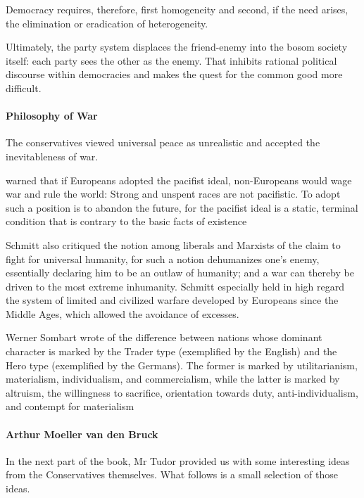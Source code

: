 \begin{quotex}
Democracy requires, therefore, first homogeneity and second, if the need arises, the elimination or eradication of
heterogeneity. 

\end{quotex}
Ultimately, the party system displaces the friend-enemy into the bosom society itself: each party sees the other as the
enemy. That inhibits rational political discourse within democracies and makes the quest for the common good more
difficult.

\paragraph{Philosophy of War}
The conservatives viewed universal peace as unrealistic and accepted the inevitableness of war.

\begin{quotex}
[Spengler] warned that if Europeans adopted the pacifist ideal, non-Europeans would wage war and rule the world: Strong
and unspent races are not pacifistic. To adopt such a position is to abandon the future, for the pacifist ideal is a
static, terminal condition that is contrary to the basic facts of existence 

\end{quotex}
Schmitt also critiqued the notion among liberals and Marxists of the claim to fight for universal humanity, for such a
notion dehumanizes one's enemy, essentially declaring him to be an outlaw of humanity; and a war can
thereby be driven to the most extreme inhumanity. Schmitt especially held in high regard the system of limited and
civilized warfare developed by Europeans since the Middle Ages, which allowed the avoidance of excesses.

\begin{quotex}
Werner Sombart wrote of the difference between nations whose dominant character is marked by the Trader type
(exemplified by the English) and the Hero type (exemplified by the Germans). The former is marked by utilitarianism,
materialism, individualism, and commercialism, while the latter is marked by altruism, the willingness to sacrifice,
orientation towards duty, anti-individualism, and contempt for materialism 

\end{quotex}
\paragraph{Arthur Moeller van den Bruck}
In the next part of the book, Mr Tudor provided us with some interesting ideas from the Conservatives themselves. What
follows is a small selection of those ideas.

